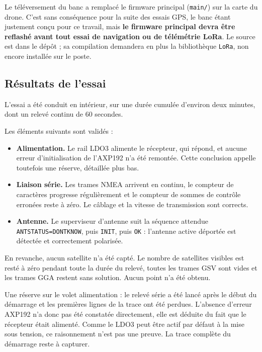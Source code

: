 \documentclass[11pt,a4paper]{article}
\newcommand{\code}[1]{\texttt{#1}}
\begin{document}
Le téléversement du banc a remplacé le firmware principal (\code{main/}) sur la
carte du drone. C'est sans conséquence pour la suite des essais GPS, le banc
étant justement conçu pour ce travail, mais \textbf{le firmware principal devra
être reflashé avant tout essai de navigation ou de télémétrie LoRa}. Le source
est dans le dépôt ; sa compilation demandera en plus la bibliothèque
\code{LoRa}, non encore installée sur le poste.

\subsection{Résultats de l'essai}

L'essai a été conduit en intérieur, sur une durée cumulée d'environ deux
minutes, dont un relevé continu de 60 secondes.

Les éléments suivants sont validés :

\begin{itemize}[leftmargin=1.2em,itemsep=0.35em]
\item \textbf{Alimentation.} Le rail LDO3 alimente le récepteur, qui répond, et aucune
erreur d'initialisation de l'AXP192 n'a été remontée. Cette conclusion
appelle toutefois une réserve, détaillée plus bas.
\item \textbf{Liaison série.} Les trames NMEA arrivent en continu, le compteur de
caractères progresse régulièrement et le compteur de sommes de contrôle
erronées reste à zéro. Le câblage et la vitesse de transmission sont corrects.
\item \textbf{Antenne.} Le superviseur d'antenne suit la séquence attendue
\code{ANTSTATUS=DONTKNOW}, puis \code{INIT}, puis \code{OK} : l'antenne active
déportée est détectée et correctement polarisée.
\end{itemize}

En revanche, aucun satellite n'a été capté. Le nombre de satellites visibles
est resté à zéro pendant toute la durée du relevé, toutes les trames GSV sont
vides et les trames GGA restent sans solution. Aucun point n'a été obtenu.

Une réserve sur le volet alimentation : le relevé série a été lancé après le
début du démarrage et les premières lignes de la trace ont été perdues.
L'absence d'erreur AXP192 n'a donc pas été constatée directement, elle est
déduite du fait que le récepteur était alimenté. Comme le LDO3 peut être actif
par défaut à la mise sous tension, ce raisonnement n'est pas une preuve. La
trace complète du démarrage reste à capturer.
\end{document}

